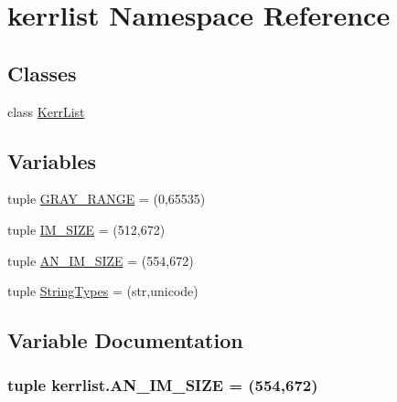 \hypertarget{namespacekerrlist}{}\section{kerrlist Namespace Reference}
\label{namespacekerrlist}
\subsection*{Classes}
\begin{DoxyCompactItemize}
\item 
class \hyperlink{classkerrlist_1_1_kerr_list}{Kerr\+List}
\end{DoxyCompactItemize}
\subsection*{Variables}
\begin{DoxyCompactItemize}
\item 
tuple \hyperlink{namespacekerrlist_a2ff49be8000266d734676b8f99701890}{G\+R\+A\+Y\+\_\+\+R\+A\+N\+GE} = (0,65535)
\item 
tuple \hyperlink{namespacekerrlist_ab72205aa20de08abd3faf47bfb1cacda}{I\+M\+\_\+\+S\+I\+ZE} = (512,672)
\item 
tuple \hyperlink{namespacekerrlist_af40c3183ef0949a3311c57a150b32815}{A\+N\+\_\+\+I\+M\+\_\+\+S\+I\+ZE} = (554,672)
\item 
tuple \hyperlink{namespacekerrlist_ae535005c9b16f15f776f3e8619cc9753}{String\+Types} = (str,unicode)
\end{DoxyCompactItemize}


\subsection{Variable Documentation}
\subsubsection[{\texorpdfstring{A\+N\+\_\+\+I\+M\+\_\+\+S\+I\+ZE}{AN_IM_SIZE}}]{\setlength{\rightskip}{0pt plus 5cm}tuple kerrlist.\+A\+N\+\_\+\+I\+M\+\_\+\+S\+I\+ZE = (554,672)}\hypertarget{namespacekerrlist_af40c3183ef0949a3311c57a150b32815}{}\label{namespacekerrlist_af40c3183ef0949a3311c57a150b32815}
